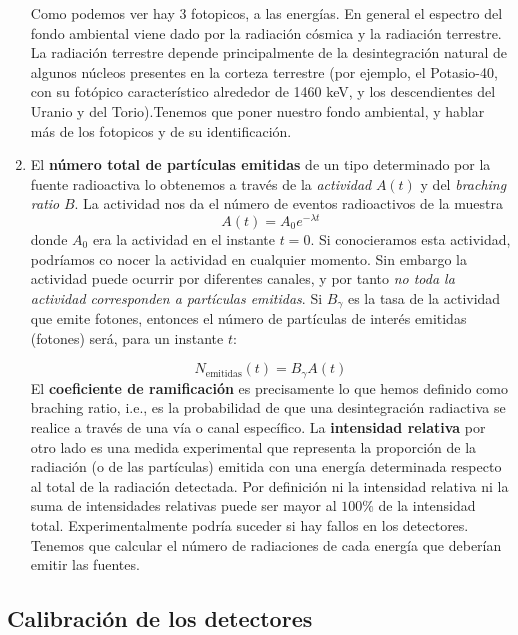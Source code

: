 \documentclass[11pt]{article}
\begin{document}
\begin{enumerate}[label=\alph*)]
    Como podemos ver hay 3 fotopicos, a las energías. En general el espectro del fondo ambiental viene dado por la radiación cósmica y la radiación terrestre. La radiación terrestre depende principalmente de la desintegración natural de algunos núcleos presentes en la corteza terrestre (por ejemplo, el Potasio-40, con su fotópico característico alrededor de 1460 keV, y los descendientes del Uranio y del Torio).\textcolor{BrickRed}{Tenemos que poner nuestro fondo ambiental, y hablar más de los fotopicos y de su identificación.}
    \item El \textbf{número total de partículas emitidas} de un tipo determinado por la fuente radioactiva lo obtenemos a través de la \textit{actividad} $A(t)$ y del \textit{braching ratio} $B$. La actividad nos da el número de eventos radioactivos de la muestra
    \begin{equation}
        A(t) = A_0 e^{-\lambda t}
    \end{equation}
    donde $A_0$ era la actividad en el instante $t=0$. Si conocieramos esta actividad, podríamos co nocer la actividad en cualquier momento. Sin embargo la actividad puede ocurrir por diferentes canales, y por tanto \textit{no toda la actividad corresponden a partículas emitidas}. Si $B_\gamma$ es la tasa de la actividad que emite fotones, entonces el número de partículas de interés emitidas (fotones) será, para un instante $t$:

    \begin{equation}
        N_{\text{emitidas}} (t) = B_\gamma A(t)
    \end{equation}
    El \textbf{coeficiente de ramificación} es precisamente lo que hemos definido como braching ratio, i.e., es la probabilidad de que una desintegración radiactiva se realice a través de una vía o canal específico. La \textbf{intensidad relativa} por otro lado es una medida experimental que representa la proporción de la radiación (o de las partículas) emitida con una energía determinada respecto al total de la radiación detectada. Por definición ni la intensidad relativa ni la suma de intensidades relativas puede ser mayor al $100\%$ de la intensidad total. Experimentalmente podría suceder si hay fallos en los detectores. \textcolor{BrickRed}{Tenemos que calcular el número de radiaciones de cada energía que deberían emitir las fuentes.}
\end{enumerate}

\subsection{Calibración de los detectores}
\end{document}
